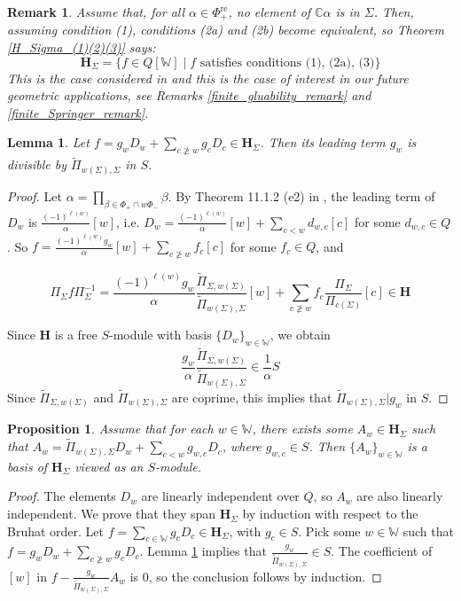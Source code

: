 \documentclass[11pt]{article}
\newcommand{\C}{\mathbb{C}}
\renewcommand{\H}{\textbf{H}}
\newcommand{\1}{\mathbb{1}}
\newcommand{\tW}{\mathbb{W}}
\newcommand{\tPi}{\widetilde{\Pi}}
\newcommand{\bbPhire}{\mathbb{\Phi}^\text{re}}
\newtheorem{lemma}[theorem]{Lemma}
\newtheorem{proposition}[theorem]{Proposition}
\newtheorem{remark}[theorem]{Remark}
\theoremstyle{definition}
\numberwithin{equation}{section}
\begin{document}
\begin{remark}
    Assume that, for all $\alpha \in \bbPhire_+$, no element of $\C \alpha$ is in $\Sigma$. Then, assuming condition (1), conditions (2a) and (2b) become equivalent, so Theorem \ref{H_Sigma_(1)(2)(3)} says:
    $$\H_\Sigma = \{ f \in Q[\tW] \mid f \text{ satisfies conditions (1), (2a), (3)}\}$$
    This is the case considered in \cite{GKV} and this is the case of interest in our future geometric applications, see Remarks \ref{finite_gluability_remark} and \ref{finite_Springer_remark}.
\end{remark}

\begin{lemma}
\label{correct_leading_term}
    Let $f = g_w D_w + \sum_{c \not\geq w} g_c D_c \in \H_\Sigma$. Then its leading term $g_w$ is divisible by $\tPi_{w(\Sigma),\Sigma}$ in $S$.
\end{lemma}

\begin{proof}
    Let $\alpha = \prod_{\beta \in \mathbb{\Phi}_+ \cap w \mathbb{\Phi}_-} \beta$. By Theorem 11.1.2 (e2) in \cite{Ku}, the leading term of $D_w$ is $\frac{(-1)^{\ell(w)}}{\alpha} [w]$, i.e. $D_w = \frac{(-1)^{\ell(w)}}{\alpha} [w] + \sum_{c< w} d_{w,c} [c]$ for some $d_{w,c} \in Q$. So $f = \frac{(-1)^{\ell(w)}g_w}{\alpha} [w] + \sum_{c \not\geq w} f_c [c]$ for some $f_c\in Q$, and
    
    $$\Pi_\Sigma f \Pi_{\Sigma}^{-1} = \frac{(-1)^{\ell(w)}g_w}{\alpha} \frac{\tPi_{\Sigma,w(\Sigma)}}{\tPi_{w(\Sigma),\Sigma}}[w] + \sum_{c\not 
    \geq w} f_c \frac{\Pi_\Sigma}{\Pi_{c(\Sigma)}}[c] \in \H$$
    
    \noindent Since $\H$ is a free $S$-module with basis $\{D_w\}_{w\in \tW}$, we obtain
    $$\frac{g_w}{\alpha} \frac{\tPi_{\Sigma,w(\Sigma)}}{\tPi_{w(\Sigma),\Sigma}} \in \frac{1}{\alpha} S$$
    Since $\tPi_{\Sigma,w(\Sigma)}$ and $\tPi_{w(\Sigma),\Sigma}$ are coprime, this implies that $\tPi_{w(\Sigma),\Sigma} | g_w$ in $S$.
\end{proof} 

\begin{proposition}
    \label{H_Sigma_basis}
    Assume that for each $w\in \tW$, there exists some $A_w \in \H_\Sigma$ such that \mbox{$A_w= \tPi_{w(\Sigma),\Sigma} D_w + \sum_{c < w} g_{w,c} D_c$}, where $g_{w,c} \in S$. Then $\{ A_w\}_{w\in\tW}$ is a basis of $\H_\Sigma$ viewed as an $S$-module.
\end{proposition}

\begin{proof}
The elements $D_w$ are linearly independent over $Q$, so $A_w$ are also linearly independent. We prove that they span $\H_\Sigma$ by induction with respect to the Bruhat order. Let $f = \sum_{c\in \tW} g_c D_c \in \H_\Sigma$, with $g_c \in S$. Pick some $w\in \tW$ such that $f = g_w D_w + \sum_{c\not \geq w} g_c D_c$. Lemma \ref{correct_leading_term} implies that $\frac{g_w}{\tPi_{w(\Sigma),\Sigma}}  \in S$. The coefficient of $[w]$ in $f - \frac{g_w}{\tPi_{w(\Sigma),\Sigma}}  A_w$ is $0$, so the conclusion follows by induction.
\end{proof}
\end{document}
